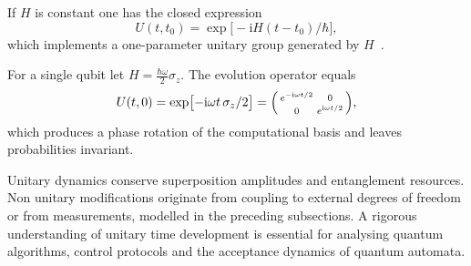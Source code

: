 \begin{remark}
	If $H$ is constant one has the closed expression
	\[
		U(t,t_{0}) = \exp\bigl[-\mathrm iH(t-t_{0})/\hbar\bigr] ,
	\]
	which implements a one-parameter unitary group generated by $H$~\cite{nielsen2010quantum}.
\end{remark}

\begin{example}\label{ex:qubit_rotation}
	For a single qubit let $H=\tfrac{\hbar\omega}{2}\sigma_{z}$.  
	The evolution operator equals
	\[
		U(t,0)=\exp\bigl[-\mathrm i\omega t\,\sigma_{z}/2\bigr]
		=\begin{psmallmatrix}
			 e^{-\mathrm i\omega t/2} & 0 \\[2pt]
			 0 & e^{\mathrm i\omega t/2}
		  \end{psmallmatrix},
	\]
	which produces a phase rotation of the computational basis and leaves probabilities invariant.
\end{example}


Unitary dynamics conserve superposition amplitudes and entanglement resources.  
Non unitary modifications originate from coupling to external degrees of freedom or from measurements, modelled in the preceding subsections.  
A rigorous understanding of unitary time development is essential for analysing quantum algorithms, control protocols and the acceptance dynamics of quantum automata.
